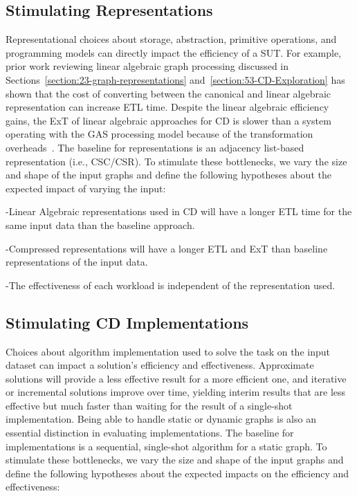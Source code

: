 \subsection{Stimulating Representations}
Representational choices about storage, abstraction, primitive operations, and programming models can directly impact the efficiency of a \ac{SUT}.
For example, prior work reviewing linear algebraic graph processing discussed in Sections~\ref{section:23-graph-representations} and~\ref{section:53-CD-Exploration} has shown that the cost of converting between the canonical and linear algebraic representation can increase \ac{ETL} time. 
Despite the linear algebraic efficiency gains, the \ac{ExT} of linear algebraic approaches for \ac{CD} is slower than a system operating with the \ac{GAS} processing model because of the transformation overheads~\cite{Low2020}. 
The baseline for representations is an adjacency list-based representation (i.e., \ac{CSC}/\ac{CSR}).
To stimulate these bottlenecks, we vary the size and shape of the input graphs and define the following hypotheses about the expected impact of varying the input:

\hyp{Linear Algebraic representations used in \ac{CD} will have a longer \ac{ETL} time for the same input data than the baseline approach.}

\hyp{Compressed representations will have a longer \ac{ETL} and \ac{ExT} than baseline representations of the input data.}

\hyp{The effectiveness of each workload is independent of the representation used.}

\subsection{Stimulating \ac{CD} Implementations}
Choices about algorithm implementation used to solve the task on the input dataset can impact a solution's efficiency and effectiveness. 
Approximate solutions will provide a less effective result for a more efficient one, and iterative or incremental solutions improve over time, yielding interim results that are less effective but much faster than waiting for the result of a single-shot implementation.
Being able to handle static or dynamic graphs is also an essential distinction in evaluating implementations. 
The baseline for implementations is a sequential, single-shot algorithm for a static graph.
To stimulate these bottlenecks, we vary the size and shape of the input graphs and define the following hypotheses about the expected impacts on the efficiency and effectiveness:

